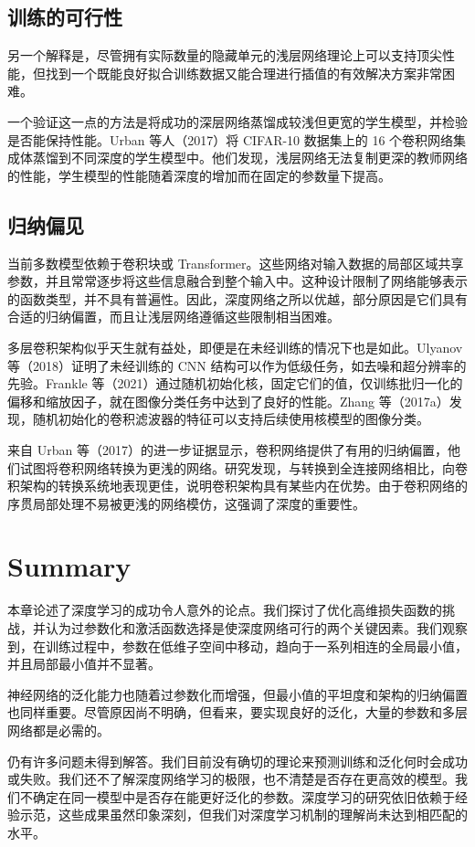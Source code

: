 \subsection{训练的可行性}
另一个解释是，尽管拥有实际数量的隐藏单元的浅层网络理论上可以支持顶尖性能，但找到一个既能良好拟合训练数据又能合理进行插值的有效解决方案非常困难。

一个验证这一点的方法是将成功的深层网络蒸馏成较浅但更宽的学生模型，并检验是否能保持性能。Urban 等人（2017）将 CIFAR-10 数据集上的 16 个卷积网络集成体蒸馏到不同深度的学生模型中。他们发现，浅层网络无法复制更深的教师网络的性能，学生模型的性能随着深度的增加而在固定的参数量下提高。

\subsection{归纳偏见}
当前多数模型依赖于卷积块或 Transformer。这些网络对输入数据的局部区域共享参数，并且常常逐步将这些信息融合到整个输入中。这种设计限制了网络能够表示的函数类型，并不具有普遍性。因此，深度网络之所以优越，部分原因是它们具有合适的归纳偏置，而且让浅层网络遵循这些限制相当困难。

多层卷积架构似乎天生就有益处，即便是在未经训练的情况下也是如此。Ulyanov 等（2018）证明了未经训练的 CNN 结构可以作为低级任务，如去噪和超分辨率的先验。Frankle 等（2021）通过随机初始化核，固定它们的值，仅训练批归一化的偏移和缩放因子，就在图像分类任务中达到了良好的性能。Zhang 等（2017a）发现，随机初始化的卷积滤波器的特征可以支持后续使用核模型的图像分类。

来自 Urban 等（2017）的进一步证据显示，卷积网络提供了有用的归纳偏置，他们试图将卷积网络转换为更浅的网络。研究发现，与转换到全连接网络相比，向卷积架构的转换系统地表现更佳，说明卷积架构具有某些内在优势。由于卷积网络的序贯局部处理不易被更浅的网络模仿，这强调了深度的重要性。


\section{Summary}
本章论述了深度学习的成功令人意外的论点。我们探讨了优化高维损失函数的挑战，并认为过参数化和激活函数选择是使深度网络可行的两个关键因素。我们观察到，在训练过程中，参数在低维子空间中移动，趋向于一系列相连的全局最小值，并且局部最小值并不显著。

神经网络的泛化能力也随着过参数化而增强，但最小值的平坦度和架构的归纳偏置也同样重要。尽管原因尚不明确，但看来，要实现良好的泛化，大量的参数和多层网络都是必需的。

仍有许多问题未得到解答。我们目前没有确切的理论来预测训练和泛化何时会成功或失败。我们还不了解深度网络学习的极限，也不清楚是否存在更高效的模型。我们不确定在同一模型中是否存在能更好泛化的参数。深度学习的研究依旧依赖于经验示范，这些成果虽然印象深刻，但我们对深度学习机制的理解尚未达到相匹配的水平。

